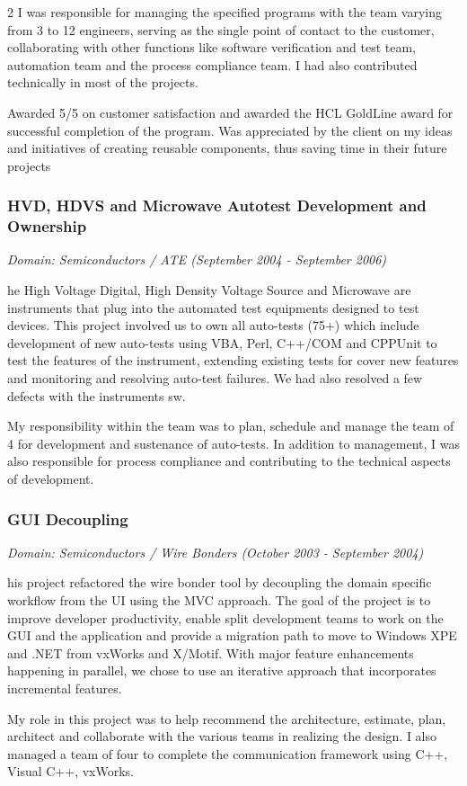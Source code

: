 \documentclass[a4paper,11pt]{article}
\newcommand\cvprojectentry[5]{
  \subsubsection*{#1}
  
  \vspace{-7pt}
  
  \it{Domain: #2}\normalfont{} \quad (#3 - #4)
  
}
\begin{document}
\begin{multicols}{2}
I was responsible for managing the specified programs with the team
varying from 3 to 12 engineers, serving as the single point of contact
to the customer, collaborating with other functions like software
verification and test team, automation team and the process compliance
team. I had also contributed technically in most of the projects.
 
Awarded 5/5 on customer satisfaction and awarded the HCL GoldLine
award for successful completion of the program. Was appreciated by the
client on my ideas and initiatives of creating reusable components,
thus saving time in their future projects
 
\cvprojectentry{HVD, HDVS and Microwave Autotest Development and
  Ownership}{Semiconductors / ATE}{September 2004}{September 2006}

The High Voltage Digital, High Density Voltage Source and Microwave
are instruments that plug into the automated test equipments designed
to test devices. This project involved us to own all auto-tests (75+)
which include development of new auto-tests using VBA, Perl, C++/COM
and CPPUnit to test the features of the instrument, extending existing
tests for cover new features and monitoring and resolving auto-test
failures. We had also resolved a few defects with the instruments sw.
 
My responsibility within the team was to plan, schedule and manage the
team of 4 for development and sustenance of auto-tests. In addition
to management, I was also responsible for process compliance and
contributing to the technical aspects of development.
 
\cvprojectentry{GUI Decoupling}{Semiconductors / Wire Bonders}{October 2003}{September 2004}

This project refactored the wire bonder tool by decoupling the domain
specific workflow from the UI using the MVC approach. The goal of the
project is to improve developer productivity, enable split development
teams to work on the GUI and the application and provide a migration
path to move to Windows XPE and .NET from vxWorks and X/Motif. With
major feature enhancements happening in parallel, we chose to use an
iterative approach that incorporates incremental features.
 
My role in this project was to help recommend the architecture,
estimate, plan, architect and collaborate with the various teams in
realizing the design. I also managed a team of four to complete the
communication framework using C++, Visual C++, vxWorks.
 

\end{multicols}
\end{document}
